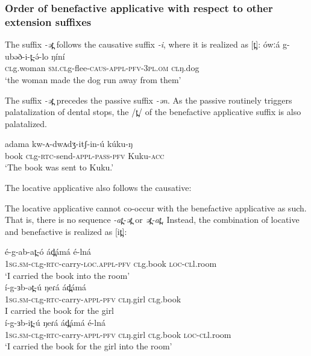 

\subsubsection{Order of benefactive applicative with respect to other extension suffixes}

The suffix \textit{-ət̪} follows the causative suffix \textit{-i}, where it is realized as [t̪]:
\ea
\gll ówːá  		g-ubəð-i-t̪-ə́-lo 				ŋíní\\
\textsc{cl}g.woman 	\textsc{sm.cl}g-flee-\textsc{caus-appl-\textsc{pfv}-3pl.om}	\textsc{cl}ŋ.dog\\
\trans ‘the woman made the dog run away from them’\\
\z

The suffix \textit{-ət̪} precedes the passive suffix \textit{-ən}. As the passive routinely triggers palatalization of dental stops, the /t̪/ of the benefactive applicative suffix is also palatalized.

\ea 
	\gll adama kw-ʌ-dwʌdʒ-itʃ-in-ú kúku-ŋ\\ %
		book  \textsc{cl}g-\textsc{rtc}-send-\textsc{appl-pass-pfv} Kuku-\textsc{acc} \\
	\glt `The book was sent to Kuku.'
\z

The locative applicative also follows the causative:




The locative applicative cannot co-occur with the benefactive applicative as such. That is, there is no sequence \textit{-at̪-ət̪} or \textit{ət̪-at̪}. Instead, the combination of locative and benefactive is realized as [it̪]:

\ea
\ea \gll é-g-ab-at̪-ó 				ád̪ámá 		é-lná  \\
	1\textsc{sg.sm-cl}g-\textsc{rtc}-carry-\textsc{loc.appl-\textsc{pfv}}	\textsc{cl}g.book	\textsc{loc-cl}l.room\\
	\trans ‘I carried the book into the room’\\

\ex \gll	í-g-ɜb-ət̪-ú 				ŋeɾá 		ád̪ámá  \\
	1\textsc{sg.sm-cl}g-\textsc{rtc}-carry-\textsc{appl-\textsc{pfv}}	\textsc{cl}ŋ.girl		\textsc{cl}g.book	 \\
	\trans I carried the book for the girl\\

\ex \gll	í-g-ɜb-it̪-ú 				ŋeɾá 		ád̪ámá 		é-lná  \\
	1\textsc{sg.sm-cl}g-\textsc{rtc}-carry-\textsc{appl-\textsc{pfv}}	\textsc{cl}ŋ.girl		\textsc{cl}g.book	\textsc{loc-cl}l.room\\
	\trans ‘I carried the book for the girl into the room’\\
\z
\z

